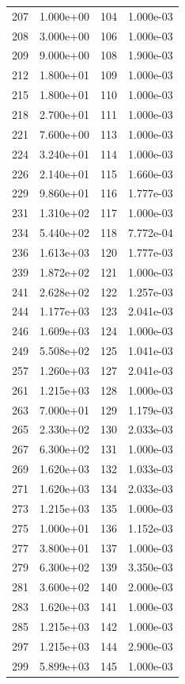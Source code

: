 \documentclass[12pt]{article}
\begin{document}
\begin{longtable}{@{}cccc@{}}
207 & 1.000e+00 & 104 & 1.000e-03 \\
208 & 3.000e+00 & 106 & 1.000e-03 \\
209 & 9.000e+00 & 108 & 1.900e-03 \\
212 & 1.800e+01 & 109 & 1.000e-03 \\
215 & 1.800e+01 & 110 & 1.000e-03 \\
218 & 2.700e+01 & 111 & 1.000e-03 \\
221 & 7.600e+00 & 113 & 1.000e-03 \\
224 & 3.240e+01 & 114 & 1.000e-03 \\
226 & 2.140e+01 & 115 & 1.660e-03 \\
229 & 9.860e+01 & 116 & 1.777e-03 \\
231 & 1.310e+02 & 117 & 1.000e-03 \\
234 & 5.440e+02 & 118 & 7.772e-04 \\
236 & 1.613e+03 & 120 & 1.777e-03 \\
239 & 1.872e+02 & 121 & 1.000e-03 \\
241 & 2.628e+02 & 122 & 1.257e-03 \\
244 & 1.177e+03 & 123 & 2.041e-03 \\
246 & 1.609e+03 & 124 & 1.000e-03 \\
249 & 5.508e+02 & 125 & 1.041e-03 \\
257 & 1.260e+03 & 127 & 2.041e-03 \\
261 & 1.215e+03 & 128 & 1.000e-03 \\
263 & 7.000e+01 & 129 & 1.179e-03 \\
265 & 2.330e+02 & 130 & 2.033e-03 \\
267 & 6.300e+02 & 131 & 1.000e-03 \\
269 & 1.620e+03 & 132 & 1.033e-03 \\
271 & 1.620e+03 & 134 & 2.033e-03 \\
273 & 1.215e+03 & 135 & 1.000e-03 \\
275 & 1.000e+01 & 136 & 1.152e-03 \\
277 & 3.800e+01 & 137 & 1.000e-03 \\
279 & 6.300e+02 & 139 & 3.350e-03 \\
281 & 3.600e+02 & 140 & 2.000e-03 \\
283 & 1.620e+03 & 141 & 1.000e-03 \\
285 & 1.215e+03 & 142 & 1.000e-03 \\
297 & 1.215e+03 & 144 & 2.900e-03 \\
299 & 5.899e+03 & 145 & 1.000e-03 \\

\end{longtable}
\end{document}
